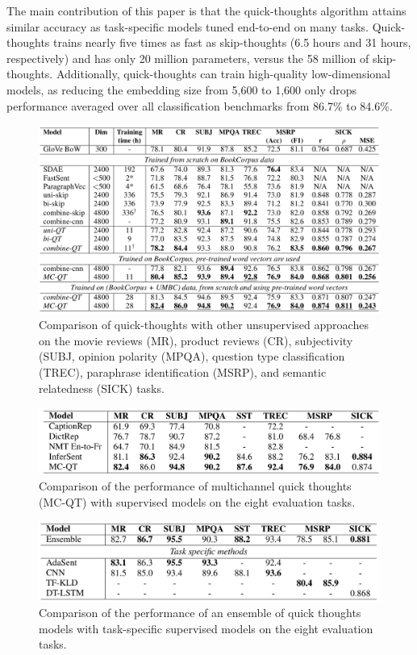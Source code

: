 The main contribution of this paper is that the quick-thoughts algorithm attains similar accuracy as task-specific models tuned end-to-end on many tasks. Quick-thoughts trains nearly five times as fast as skip-thoughts (6.5 hours and 31 hours, respectively) and has only 20 million parameters, versus the 58 million of skip-thoughts. Additionally, quick-thoughts can train high-quality low-dimensional models, as reducing the embedding size from 5,600 to 1,600 only drops performance averaged over all classification benchmarks from 86.7\% to 84.6\%. 

\newpage

\begin{figure}[h!]
\centering
  \includegraphics[width=1\linewidth]{files/quickthoughts-2.png}
  \caption{Comparison of quick-thoughts with other unsupervised approaches on the movie reviews (MR), product reviews (CR), subjectivity (SUBJ, opinion polarity (MPQA), question type classification (TREC), paraphrase identification (MSRP), and semantic relatedness (SICK) tasks.}
  \label{fig:quickthoughts-res1}
\end{figure}

\begin{figure}[h!]
\centering
  \includegraphics[width=1\linewidth]{files/quickthoughts-3.png}
  \caption{Comparison of the performance of multichannel quick thoughts (MC-QT) with supervised models on the eight evaluation tasks.}
  \label{fig:quickthoughts-res2}
\end{figure}

\begin{figure}[h!]
\centering
  \includegraphics[width=1\linewidth]{files/quickthoughts-4.png}
  \caption{Comparison of the performance of an ensemble of quick thoughts models with task-specific supervised models on the eight evaluation tasks.}
  \label{fig:quickthoughts-res3}
\end{figure}

